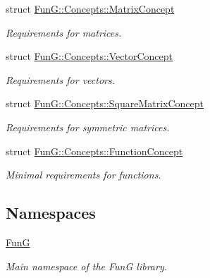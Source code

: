 \begin{DoxyCompactItemize}
struct \hyperlink{structFunG_1_1Concepts_1_1MatrixConcept}{Fun\-G\-::\-Concepts\-::\-Matrix\-Concept}
\begin{DoxyCompactList}\small\item\em Requirements for matrices. \end{DoxyCompactList}\item 
struct \hyperlink{structFunG_1_1Concepts_1_1VectorConcept}{Fun\-G\-::\-Concepts\-::\-Vector\-Concept}
\begin{DoxyCompactList}\small\item\em Requirements for vectors. \end{DoxyCompactList}\item 
struct \hyperlink{structFunG_1_1Concepts_1_1SquareMatrixConcept}{Fun\-G\-::\-Concepts\-::\-Square\-Matrix\-Concept}
\begin{DoxyCompactList}\small\item\em Requirements for symmetric matrices. \end{DoxyCompactList}\item 
struct \hyperlink{structFunG_1_1Concepts_1_1FunctionConcept}{Fun\-G\-::\-Concepts\-::\-Function\-Concept}
\begin{DoxyCompactList}\small\item\em Minimal requirements for functions. \end{DoxyCompactList}\end{DoxyCompactItemize}
\subsection*{Namespaces}
\begin{DoxyCompactItemize}
\item 
\hyperlink{namespaceFunG}{Fun\-G}
\begin{DoxyCompactList}\small\item\em Main namespace of the Fun\-G library. \end{DoxyCompactList}\end{DoxyCompactItemize}
